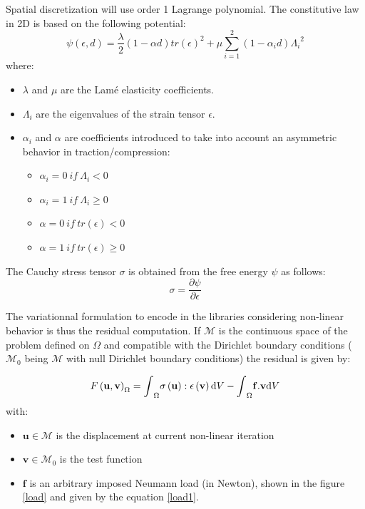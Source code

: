\documentclass[12pt]{article}
\newcommand{\vm}[1]{
	{\ensuremath{\mathbf{#1}}}
}
\newcommand{\tens}[1]{
	{\ensuremath{\mathsf{#1}}}
}
\newcommand{\stretchint}[1]{
	{\vcenter{\hbox{\stretchto[440]{\displaystyle\int}{#1}}}}
}
\begin{document}
Spatial discretization will use order 1 Lagrange polynomial. The constitutive law in 2D is based on the following potential:  
\begin{equation}
	\psi(\tens{\epsilon},d)=\frac{\lambda}{2}\left( 1-\alpha d\right)tr(\tens{\epsilon})^2 + \mu \sum_{i=1}^{2}(1-\alpha_i d){\Lambda_i}^2 
	\label{freeenergy}
\end{equation}
where:
\begin{itemize}
	\item $\lambda$ and $\mu$ are the Lam\'{e} elasticity coefficients.
	\item $\Lambda_i$ are the eigenvalues of the strain tensor $\tens{\epsilon}$.
	\item $ \alpha_i$ and $\alpha $ are coefficients introduced to take into account an asymmetric behavior in traction/compression:
	\begin{itemize}
		\item $ \alpha_i = 0 ~ if~ {\Lambda_i}<0$
		\item $ \alpha_i = 1 ~ if~ {\Lambda_i}\geqslant 0$
		\item $ \alpha = 0 ~ if~ tr(\tens{\epsilon})<0$
		\item $ \alpha = 1 ~ if~tr(\tens{\epsilon})\geqslant 0$
	\end{itemize}
\end{itemize}

The Cauchy stress tensor $\tens{\sigma}$ is  obtained from the free energy $\psi$ as follows:
\begin{equation}
		\tens{\sigma} = \frac{\partial\psi}{\partial\tens{\epsilon}}
		\label{sigfromphi}
\end{equation}  

The variationnal formulation to encode in the libraries considering non-linear behavior is thus the residual computation. If  $\mathcal{M}$ is the  continuous space of the problem defined on $\Omega$ and compatible with the Dirichlet boundary conditions ($\mathcal{M}_0$ being $\mathcal{M}$ with null Dirichlet boundary conditions) the residual is given by:

\begin{equation}
	F\left( \vm{u},\vm{v} \right)_{\Omega} =\stretchint{5ex}_{\Omega}
	\tens{\sigma \left( \vm{u} \right)}:\tens{\epsilon}\left( \vm{v}\right)\mathrm{d}V
	-\stretchint{5ex}_{\Omega} \vm{f}.\vm{v}\mathrm{d}V 
	\label{formF}
\end{equation}
with:
\begin{itemize}
	\item $\vm{u}\in \mathcal{M}$ is the displacement at current non-linear iteration
	\item $\vm{v}\in \mathcal{M}_0$ is the test function
	\item $\vm{f}$ is an arbitrary imposed Neumann load (in Newton), shown in the figure \ref{load} and given by the equation \eqref{load1}.
\end{itemize}
\end{document}
